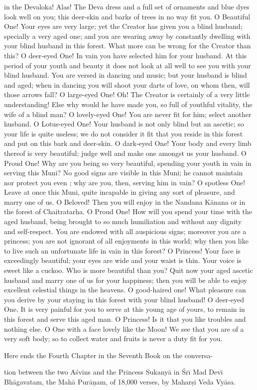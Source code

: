 in the Devaloka! Alas! The Deva dress and a full set of ornaments and blue dyes look well on you; this deer-skin and barks of trees in no way fit you. O Beautiful One! Your eyes are very large; yet the Creator has given you a blind husband; specially a very aged one; and you are wearing away by constantly dwelling with your blind husband in this forest. What more can be wrong for the Creator than this? O deer-eyed One! In vain you have selected him for your husband. At this period of your youth and beauty it does not look at all well to see you with your blind husband. You are versed in dancing and music; but your husband is blind and aged; when in dancing you will shoot your darts of love, on whom then, will those arrows fall? O large-eyed One! Oh! The Creator is certainly of a very little understanding! Else why would he have made you, so full of youthful vitality, the wife of a blind man? O lovely-eyed One! You are never fit for him; select another husband. O Lotus-eyed One! Your husband is not only blind but an ascetic; so your life is quite useless; we do not consider it fit that you reside in this forest and put on this bark and deer-skin. O dark-eyed One! Your body and every limb thereof is very beautiful; judge well and make one amongst us your husband. O Proud One! Why are you being so very beautiful, spending your youth in vain in serving this Muni? No good signs are visible in this Muni; he cannot maintain nor protect you even ; why are you, then, serving him in vain? O spotless One! Leave at once this Muni, quite incapable in giving any sort of pleasure, and marry one of us. O Beloved! Then you will enjoy in the Nandana K\=anana or in the forest of Chaitratarha. O Proud One! How will you spend your time with the aged husband, being brought to so much humiliation and without any dignity and self-respect. You are endowed with all auspicious signs; moreover you are a princess; you are not ignorant of all enjoyments in this world; why then you like to live such an unfortunate life in vain in this forest? O Princess! Your face is exceedingly beautiful; your eyes are wide and your waist is thin. Your voice is sweet like a cuckoo. Who is more beautiful than you? Quit now your aged ascetic husband and marry one of us for your happiness; then you will be able to enjoy excellent celestial things in the heavens. O good-haired one! What pleasure can you derive by your staying in this forest with your blind husband! O deer-eyed One. It is very painful for you to serve at this young age of yours, to remain in this forest and serve this aged man. O Princess! Is it that you like troubles and nothing else. O One with a face lovely like the Moon! We see that you are of a very soft body; so to collect water and fruits is never a duty fit for you.

Here ends the Fourth Chapter in the Seventh Book on the conversa-

tion between the two A\'svins and the Princess Sukany\=a in \'Sr\={\i} Mad Dev\={\i} Bh\=agavatam, the Mah\=a Pur\=a\d{n}am, of 18,000 verses, by Mahar\d{s}i Veda Vy\=asa.



